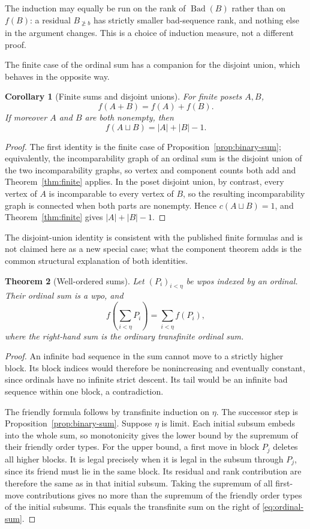 \documentclass[11pt,letterpaper]{article}
\newtheorem{theorem}{Theorem}[section]
\newtheorem{corollary}[theorem]{Corollary}
\theoremstyle{definition}
\theoremstyle{remark}
\newcommand{\Bad}{\operatorname{Bad}}
\newcommand{\res}[2]{#1_{\not\ge #2}}
\begin{document}
The induction may equally be run on the rank of $\Bad(B)$ rather than on
$f(B)$: a residual $\res B b$ has strictly smaller bad-sequence rank, and
nothing else in the argument changes. This is a choice of induction measure,
not a different proof.

The finite case of the ordinal sum has a companion for the disjoint union,
which behaves in the opposite way.

\begin{corollary}[Finite sums and disjoint unions]\label{cor:finite-sums}
For finite posets $A,B$,
\[
 f(A+B)=f(A)+f(B).
\]
If moreover $A$ and $B$ are both nonempty, then
\[
 f(A\sqcup B)=|A|+|B|-1.
\]
\end{corollary}
\begin{proof}
The first identity is the finite case of
Proposition~\ref{prop:binary-sum}; equivalently, the incomparability graph
of an ordinal sum is the disjoint union of the two incomparability graphs,
so vertex and component counts both add and
Theorem~\ref{thm:finite} applies. In the poset disjoint union, by contrast,
every vertex of $A$ is incomparable to every vertex of $B$, so the resulting
incomparability graph is connected when both parts are nonempty. Hence
$c(A\sqcup B)=1$, and Theorem~\ref{thm:finite} gives $|A|+|B|-1$.
\end{proof}

The disjoint-union identity is consistent with the published finite
formulas and is not claimed here as a new special case; what the component
theorem adds is the common structural explanation of both identities.

\begin{theorem}[Well-ordered sums]\label{thm:ordinal-sum}
Let $(P_i)_{i<\eta}$ be wpos indexed by an ordinal. Their ordinal sum is a
wpo, and
\begin{equation}\label{eq:ordinal-sum}
 f\left(\sum_{i<\eta}P_i\right)=\sum_{i<\eta}f(P_i),
\end{equation}
where the right-hand sum is the ordinary transfinite ordinal sum.
\end{theorem}
\begin{proof}
An infinite bad sequence in the sum cannot move to a strictly higher
block. Its block indices would therefore be nonincreasing and eventually
constant, since ordinals have no infinite strict descent. Its tail would
be an infinite bad sequence within one block, a contradiction.

The friendly formula follows by transfinite induction on $\eta$.
The successor step is Proposition~\ref{prop:binary-sum}. Suppose $\eta$
is limit. Each initial subsum embeds into the whole sum, so monotonicity
gives the lower bound by the supremum of their friendly order types.
For the upper bound, a first move in block $P_j$ deletes all higher blocks.
It is legal precisely when it is legal in the subsum through $P_j$, since
its friend must lie in the same block. Its residual and rank contribution
are therefore the same as in that initial subsum. Taking the supremum
of all first-move contributions gives no more than the supremum of the
friendly order types of the initial subsums. This equals the transfinite
sum on the right of \eqref{eq:ordinal-sum}.
\end{proof}
\end{document}
